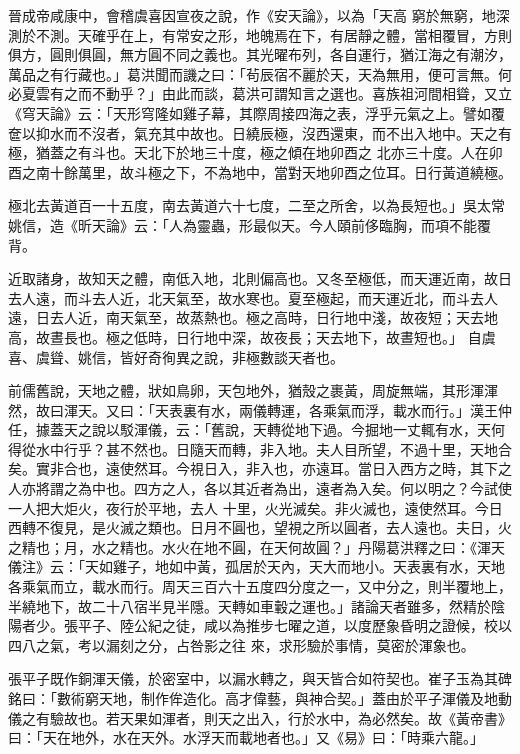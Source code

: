 \begin{pinyinscope}
 晉成帝咸康中，會稽虞喜因宣夜之說，作《安天論》，以為「天高
 窮於無窮，地深測於不測。天確乎在上，有常安之形，地魄焉在下，有居靜之體，當相覆冒，方則俱方，圓則俱圓，無方圓不同之義也。其光曜布列，各自運行，猶江海之有潮汐，萬品之有行藏也。」葛洪聞而譏之曰：「茍辰宿不麗於天，天為無用，便可言無。何必夏雲有之而不動乎？」由此而談，葛洪可謂知言之選也。喜族祖河間相聳，又立《穹天論》云：「天形穹隆如雞子幕，其際周接四海之表，浮乎元氣之上。譬如覆奩以抑水而不沒者，氣充其中故也。日繞辰極，沒西還東，而不出入地中。天之有極，猶蓋之有斗也。天北下於地三十度，極之傾在地卯酉之
 北亦三十度。人在卯酉之南十餘萬里，故斗極之下，不為地中，當對天地卯酉之位耳。日行黃道繞極。



 極北去黃道百一十五度，南去黃道六十七度，二至之所舍，以為長短也。」吳太常姚信，造《昕天論》云：「人為靈蟲，形最似天。今人頤前侈臨胸，而項不能覆背。



 近取諸身，故知天之體，南低入地，北則偏高也。又冬至極低，而天運近南，故日去人遠，而斗去人近，北天氣至，故水寒也。夏至極起，而天運近北，而斗去人遠，日去人近，南天氣至，故蒸熱也。極之高時，日行地中淺，故夜短；天去地高，故晝長也。極之低時，日行地中深，故夜長；天去地下，故晝短也。」
 自虞喜、虞聳、姚信，皆好奇徇異之說，非極數談天者也。



 前儒舊說，天地之體，狀如鳥卵，天包地外，猶殼之裹黃，周旋無端，其形渾渾然，故曰渾天。又曰：「天表裏有水，兩儀轉運，各乘氣而浮，載水而行。」漢王仲任，據蓋天之說以駁渾儀，云：「舊說，天轉從地下過。今掘地一丈輒有水，天何得從水中行乎？甚不然也。日隨天而轉，非入地。夫人目所望，不過十里，天地合矣。實非合也，遠使然耳。今視日入，非入也，亦遠耳。當日入西方之時，其下之人亦將謂之為中也。四方之人，各以其近者為出，遠者為入矣。何以明之？今試使一人把大炬火，夜行於平地，去人
 十里，火光滅矣。非火滅也，遠使然耳。今日西轉不復見，是火滅之類也。日月不圓也，望視之所以圓者，去人遠也。夫日，火之精也；月，水之精也。水火在地不圓，在天何故圓？」丹陽葛洪釋之曰：《渾天儀注》云：「天如雞子，地如中黃，孤居於天內，天大而地小。天表裏有水，天地各乘氣而立，載水而行。周天三百六十五度四分度之一，又中分之，則半覆地上，半繞地下，故二十八宿半見半隱。天轉如車轂之運也。」諸論天者雖多，然精於陰陽者少。張平子、陸公紀之徒，咸以為推步七曜之道，以度歷象昏明之證候，校以四八之氣，考以漏刻之分，占咎影之往
 來，求形驗於事情，莫密於渾象也。



 張平子既作銅渾天儀，於密室中，以漏水轉之，與天皆合如符契也。崔子玉為其碑銘曰：「數術窮天地，制作侔造化。高才偉藝，與神合契。」蓋由於平子渾儀及地動儀之有驗故也。若天果如渾者，則天之出入，行於水中，為必然矣。故《黃帝書》曰：「天在地外，水在天外。水浮天而載地者也。」又《易》曰：「時乘六龍。」




\end{pinyinscope}
